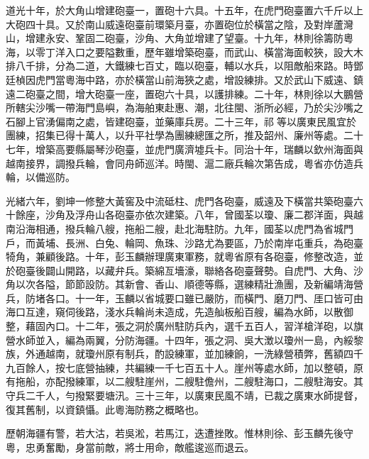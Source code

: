 \begin{pinyinscope}
道光十年，於大角山增建砲臺一，置砲十六具。十五年，在虎門砲臺置六千斤以上大砲四十具。又於南山威遠砲臺前環築月臺，亦置砲位於橫當之陰，及對岸蘆灣山，增建永安、鞏固二砲臺，沙角、大角並增建了望臺。十九年，林則徐籌防粵海，以零丁洋入口之要隘數重，歷年雖增築砲臺，而武山、橫當海面較狹，設大木排八千排，分為二道，大鐵練七百丈，臨以砲臺，輔以水兵，以阻敵船來路。時鄧廷楨因虎門當粵海中路，亦於橫當山前海狹之處，增設練排。又於武山下威遠、鎮遠二砲臺之間，增大砲臺一座，置砲六十具，以護排練。二十年，林則徐以大鵬營所轄尖沙嘴一帶海門島嶼，為海舶東赴惠、潮，北往閩、浙所必經，乃於尖沙嘴之石腳上官湧偏南之處，皆建砲臺，並藥庫兵房。二十三年，祁等以廣東民風宜於團練，招集已得十萬人，以升平社學為團練總匯之所，推及韶州、廉州等處。二十七年，增築高要縣屬琴沙砲臺，並虎門廣濟墟兵卡。同治十年，瑞麟以欽州海面與越南接界，調撥兵輪，會同舟師巡洋。時閩、滬二廠兵輪次第告成，粵省亦仿造兵輪，以備巡防。

光緒六年，劉坤一修整大黃窖及中流砥柱、虎門各砲臺，威遠及下橫當共築砲臺六十餘座，沙角及浮舟山各砲臺亦依次建築。八年，曾國荃以瓊、廉二郡洋面，與越南沿海相通，撥兵輪八艘，拖船二艘，赴北海駐防。九年，國荃以虎門為省城門戶，而黃埔、長洲、白兔、輪岡、魚珠、沙路尤為要區，乃於南岸屯重兵，為砲臺犄角，兼顧後路。十年，彭玉麟辦理廣東軍務，就粵省原有各砲臺，修整改造，並於砲臺後闢山開路，以藏弁兵。築綿亙墻濠，聯絡各砲臺聲勢。自虎門、大角、沙角以次各隘，節節設防。其新會、香山、順德等縣，選練精壯漁團，及新編靖海營兵，防堵各口。十一年，玉麟以省城要口雖已嚴防，而橫門、磨刀門、厓口皆可由海口互達，窺伺後路，淺水兵輪尚未造成，先造舢板船百艘，編為水師，以散御整，藉固內口。十二年，張之洞於廣州駐防兵內，選千五百人，習洋槍洋砲，以旗營水師並入，編為兩翼，分防海疆。十四年，張之洞、吳大澂以瓊州一島，內綏黎族，外通越南，就瓊州原有制兵，酌設練軍，並加練餉，一洗綠營積弊，舊額四千九百餘人，按七底營抽練，共編練一千七百五十人。崖州等處水師，加以整頓，原有拖船，亦配撥練軍，以二艘駐崖州，二艘駐儋州，二艘駐海口，二艘駐海安。其守兵二千人，勻撥緊要塘汛。三十三年，以廣東民風不靖，已裁之廣東水師提督，復其舊制，以資鎮懾。此粵海防務之概略也。

歷朝海疆有警，若大沽，若吳淞，若馬江，迭遭挫敗。惟林則徐、彭玉麟先後守粵，忠勇奮勵，身當前敵，將士用命，敵艦逡巡而退云。


\end{pinyinscope}